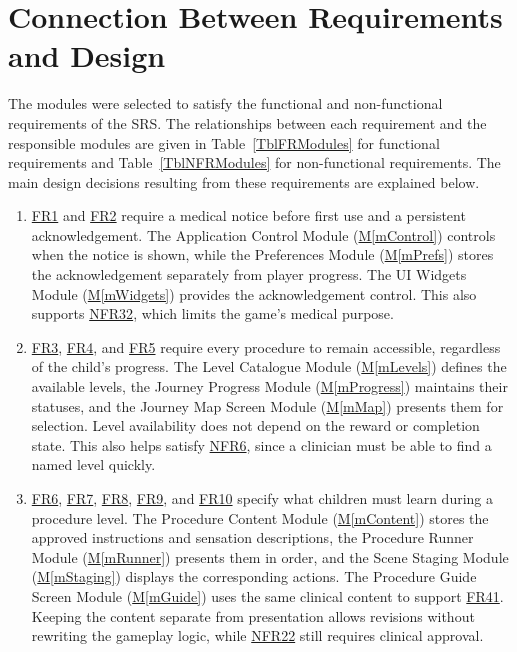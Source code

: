 \documentclass[10pt, titlepage]{article}
\newcommand{\srsurl}{https://team-hindsight.github.io/ophthamology-game/SRS/SRS.pdf}
\newcommand{\srsitemref}[2]{\href{\srsurl\#nameddest=#1}{#2}}
\newcommand{\mref}[1]{\texorpdfstring{\hyperref[md:#1]{M\ref*{#1}}}{M\ref*{#1}}}
\begin{document}
\newpage
\section{Connection Between Requirements and Design} \label{SecConnection}

The modules were selected to satisfy the functional and non-functional requirements
of the SRS. The relationships between each requirement and the responsible modules
are given in Table~\ref{TblFRModules} for functional requirements and
Table~\ref{TblNFRModules} for non-functional requirements. The main design
decisions resulting from these requirements are explained below.

\begin{enumerate}[leftmargin=*, itemsep=0.5em, parsep=0.15em]
\item \srsitemref{FR_MedicalNotice}{FR1} and \srsitemref{FR_RecordAck}{FR2}
  require a medical notice before first use and a persistent acknowledgement.
  The Application Control Module (\mref{mControl}) controls when the notice is
  shown, while the Preferences Module (\mref{mPrefs}) stores the
  acknowledgement separately from player progress. The UI Widgets Module
  (\mref{mWidgets}) provides the acknowledgement control. This also supports
  \srsitemref{NFR_NoClaims}{NFR32}, which limits the game's medical purpose.

\item \srsitemref{FR_JourneyMap}{FR3}, \srsitemref{FR_StartLevel}{FR4}, and
  \srsitemref{FR_Replay}{FR5} require every procedure to remain accessible,
  regardless of the child's progress. The Level Catalogue Module
  (\mref{mLevels}) defines the available levels, the Journey Progress Module
  (\mref{mProgress}) maintains their statuses, and the Journey Map Screen
  Module (\mref{mMap}) presents them for selection. Level availability does not
  depend on the reward or completion state. This also helps satisfy
  \srsitemref{NFR_ClinicianUse}{NFR6}, since a clinician must be able to find
  a named level quickly.

\item \srsitemref{FR_LevelContent}{FR6}, \srsitemref{FR_DescribeSensations}{FR7},
  \srsitemref{FR_TruthfulSensations}{FR8}, \srsitemref{FR_ClinicsDiffer}{FR9},
  and \srsitemref{FR_SpeakUp}{FR10} specify what children must learn during a
  procedure level. The Procedure Content Module (\mref{mContent}) stores the
  approved instructions and sensation descriptions, the Procedure Runner Module
  (\mref{mRunner}) presents them in order, and the Scene Staging Module
  (\mref{mStaging}) displays the corresponding actions. The Procedure Guide
  Screen Module (\mref{mGuide}) uses the same clinical content to support
  \srsitemref{FR_ProcedureGuide}{FR41}. Keeping the content separate from
  presentation allows revisions without rewriting the gameplay logic, while
  \srsitemref{NFR_ClinicalAccuracy}{NFR22} still requires clinical approval.


\end{enumerate}
\end{document}
